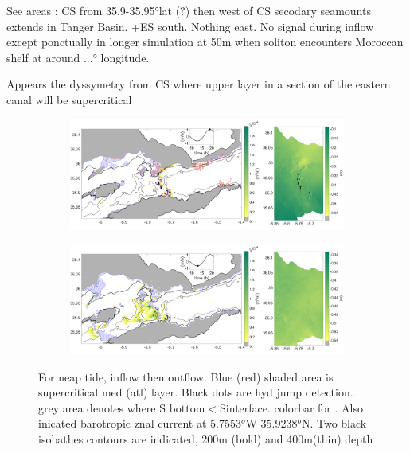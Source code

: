  See areas : CS from 35.9-35.95°lat (?) then west of CS secodary seamounts extends in Tanger Basin. +ES south. Nothing east. No signal during inflow except ponctually in longer simulation at 50m when soliton encounters Moroccan shelf at around ...° longitude.

 
 Appears the dyssymetry from CS where upper layer in a section of the eastern canal will be supercritical
 

\begin{figure}[!h]
 \centering
 
 \begin{subfigure}{\linewidth}
\centering
\includegraphics[width=1\linewidth]{./GBR3D/ME2_19h_p.png}
\end{subfigure}
 
 \begin{subfigure}{\linewidth}
\centering
\includegraphics[width=\linewidth]{./GBR3D/ME2_13h_p.png}
\end{subfigure}
\caption {For neap tide, inflow then outflow. Blue (red) shaded area is supercritical med (atl) layer. Black dots are hyd jump detection. grey area denotes where S bottom$<$Sinterface. colorbar for . Also inicated barotropic znal current at 5.7553$^o$W  35.9238$^o$N. Two black isobathes contours are indicated, 200m (bold) and 400m(thin) depth  }
\end{figure}

